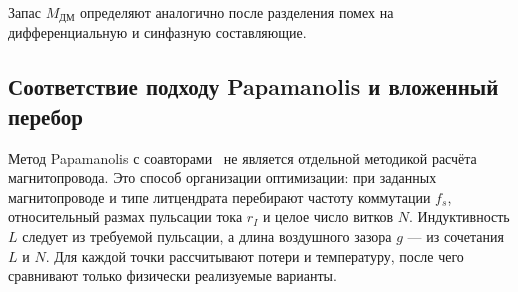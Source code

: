 \documentclass[14pt,a4paper]{extarticle}
\begin{document}
Запас $M_{\text{ДМ}}$ определяют аналогично после разделения помех на
дифференциальную и синфазную составляющие.

\subsection{Соответствие подходу Papamanolis и вложенный перебор}
\label{subsec:papamanolis-search}

Метод Papamanolis с соавторами~\cite{papamanolis} не является отдельной
методикой расчёта магнитопровода. Это способ организации оптимизации:
при заданных магнитопроводе и типе литцендрата перебирают частоту
коммутации $f_s$, относительный размах пульсации тока $r_I$ и целое число
витков $N$. Индуктивность $L$ следует из требуемой пульсации, а длина
воздушного зазора $g$ --- из сочетания $L$ и $N$. Для каждой точки
рассчитывают потери и температуру, после чего сравнивают только физически
реализуемые варианты.
\end{document}
